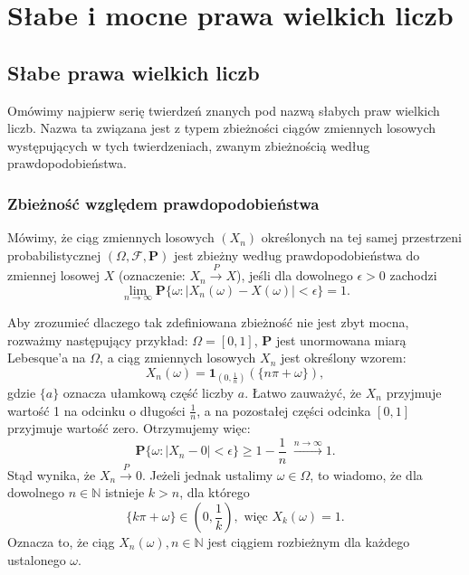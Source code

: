 \chapter{Słabe i mocne prawa wielkich liczb}
\section{Słabe prawa wielkich liczb}
Omówimy najpierw serię twierdzeń znanych pod nazwą słabych praw wielkich liczb. Nazwa ta związana jest z typem zbieżności ciągów zmiennych losowych występujących w tych twierdzeniach, zwanym zbieżnością według prawdopodobieństwa. 
\subsection{Zbieżność względem prawdopodobieństwa}
	\begin{df}
		Mówimy, że ciąg zmiennych losowych $(X_n)$ określonych na tej samej przestrzeni probabilistycznej $(\Omega, \mathcal{F}, \textbf{P})$ jest zbieżny według prawdopodobieństwa do zmiennej losowej $X$ (oznaczenie: $X_n \stackrel{P}{\rightarrow} X$), jeśli dla dowolnego $\epsilon > 0$ zachodzi
		\begin{equation}
		\lim_{n\rightarrow \infty} \textbf{P} \{ \omega : |X_n(\omega) - X(\omega)| < \epsilon  \} =1.
		\end{equation}
	\end{df}
	
	\begin{przyk}
		Aby zrozumieć dlaczego tak zdefiniowana zbieżność nie jest zbyt mocna, rozważmy następujący przykład: $\Omega = [0,1]$, \textbf{P} jest unormowana miarą Lebesque'a na $\Omega$, a ciąg zmiennych losowych $X_n$ jest określony wzorem:
		\begin{equation*}
			X_n(\omega) = \textbf{1}_{(0, \frac{1}{n})}(\{ n\pi + \omega \}),
		\end{equation*}
		gdzie $\{a\}$ oznacza ułamkową część liczby $a$. Łatwo zauważyć, że $X_n$ przyjmuje wartość 1 na odcinku o długości $
		\frac{1}{n}$, a na pozostałej części odcinka $[0,1]$ przyjmuje wartość zero. Otrzymujemy więc:
		\begin{equation*}
			\textbf{P} \{ \omega: | X_n - 0| < \epsilon \} \ge 1 - \frac{1}{n} \; \stackrel{n \to \infty}{\longrightarrow} 1.
		\end{equation*}
		Stąd wynika, że $X_n \stackrel{P}{\rightarrow} 0$. Jeżeli jednak ustalimy $\omega \in \Omega$, to wiadomo, że dla dowolnego $n \in \mathbb{N}$ istnieje $k > n$, dla którego
		\begin{equation*}
			\{ k \pi + \omega \} \in (0, \frac{1}{k}), \text{ więc } X_k(\omega) = 1.
		\end{equation*}
		Oznacza to, że ciąg $X_n(\omega), n \in \mathbb{N}$ jest ciągiem rozbieżnym dla każdego ustalonego $\omega$.
	\end{przyk}

